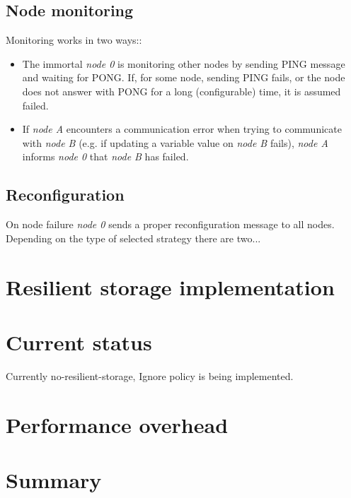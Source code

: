 \documentclass{llncs}
\begin{document}
\subsection{Node monitoring}
Monitoring works in two ways::
\begin{itemize}
\item The immortal \textit{node 0} is monitoring other nodes by sending PING message and waiting for PONG.
If, for some node, sending PING fails, or the node does not answer with PONG for a long (configurable) time,
it is assumed failed.
\item
If \textit{node A} encounters a communication error when trying to communicate with \textit{node B}
(e.g. if updating a variable value on \textit{node B} fails), \textit{node A} informs \textit{node 0} that \textit{node B} has failed.

\end{itemize}

\subsection{Reconfiguration}
On node failure \textit{node 0} sends a proper reconfiguration message to all nodes.
Depending on the type of selected strategy there are two...

\section{Resilient storage implementation}

\section{Current status}
Currently no-resilient-storage, Ignore policy is being implemented.

\section{Performance overhead}

\section{Summary}
\end{document}
